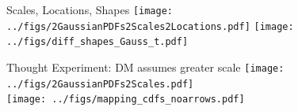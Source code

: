 
\begin{frame}{Scales, Locations, Shapes}
\centering
	\texttt{[image: ../figs/2GaussianPDFs2Scales2Locations.pdf]}
	\texttt{[image: ../figs/diff\_shapes\_Gauss\_t.pdf]}
\end{frame}

\begin{frame}{Thought Experiment: DM assumes greater scale}
\centering
	\texttt{[image: ../figs/2GaussianPDFs2Scales.pdf]} \\
	\texttt{[image: ../figs/mapping\_cdfs\_noarrows.pdf]} \\
\end{frame}

